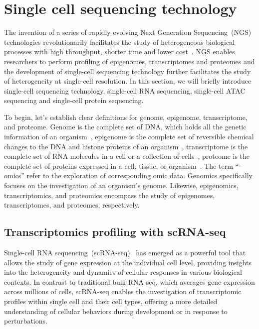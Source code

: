 \section{Single cell sequencing technology}
\label{background:profiling_singlecell}
The invention of a series of rapidly evolving Next Generation Sequencing~(NGS) technologies revolutionarily facilitates the study of heterogeneous biological processes with high throughput, shorter time and lower cost~\citep{svensson2018exponential}. NGS enables researchers to perform profiling of epigenomes, transcriptomes and proteomes and the development of single-cell sequencing technology further facilitates the study of heterogeneity at single-cell resolution. In this section, we will briefly introduce single-cell sequencing technology, single-cell RNA sequencing, single-cell ATAC sequencing and single-cell protein sequencing.

To begin, let's establish clear definitions for genome, epigenome, transcriptome, and proteome. Genome is the complete set of DNA, which holds all the genetic information of an organism~\citep{hubbard2002genome}, epigenome is the complete set of reversible chemical changes to the DNA and histone proteins of an organism~\citep{bernstein2007epigenome}, transcriptome is the complete set of RNA molecules in a cell or a collection of cells~\citep{haoudi2006proteome}, proteome is the complete set of proteins expressed in a cell, tissue, or organism~\citep{wang2009transcriptome}. The term “-omics” refer to the exploration of corresponding omic data. Genomics specifically focuses on the investigation of an organism's genome. Likewise, epigenomics, transcriptomics, and proteomics encompass the study of epigenomes, transcriptomes, and proteomes, respectively.


\subsection{Transcriptomics profiling with scRNA-seq}
\label{background:sec1:scRNA}

Single-cell RNA sequencing~(scRNA-seq)~\citep{singlecellsequencing2014, singlecellsequencing2015} has emerged as a powerful tool that allows the study of gene expression at the individual cell level, providing insights into the heterogeneity and dynamics of cellular responses in various biological contexts. In contrast to traditional bulk RNA-seq, which averages gene expression across millions of cells, scRNA-seq enables the investigation of transcriptomic profiles within single cell and their cell types, offering a more detailed understanding of cellular behaviors during development or in response to perturbations.

